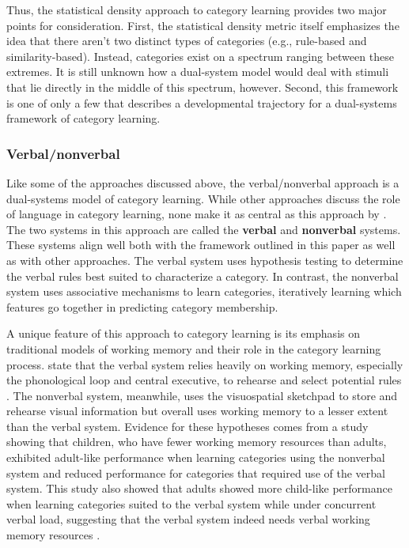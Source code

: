 \documentclass[../dissertation.tex]{subfiles}
\begin{document}
	Thus, the statistical density approach to category learning provides two major points for consideration. First, the statistical density metric itself emphasizes the idea that there aren't two distinct types of categories (e.g., rule-based and similarity-based). Instead, categories exist on a spectrum ranging between these extremes. It is still unknown how a dual-system model would deal with stimuli that lie directly in the middle of this spectrum, however. Second, this framework is one of only a few that describes a developmental trajectory for a dual-systems framework of category learning.
	
\subsubsection{Verbal/nonverbal}
	Like some of the approaches discussed above, the verbal/nonverbal approach is a dual-systems model of category learning. While other approaches discuss the role of language in category learning, none make it as central as this approach by \citet{Minda2010}. The two systems in this approach are called the \textbf{verbal} and \textbf{nonverbal} systems. These systems align well both with the framework outlined in this paper as well as with other approaches. The verbal system uses hypothesis testing to determine the verbal rules best suited to characterize a category. In contrast, the nonverbal system uses associative mechanisms to learn categories, iteratively learning which features go together in predicting category membership. \par
	A unique feature of this approach to category learning is its emphasis on traditional models of working memory and their role in the category learning process. \citet{Minda2010} state that the verbal system relies heavily on working memory, especially the phonological loop and central executive, to rehearse and select potential rules \citep{Baddeley1974}. The nonverbal system, meanwhile, uses the visuospatial sketchpad to store and rehearse visual information but overall uses working memory to a lesser extent than the verbal system. Evidence for these hypotheses comes from a study showing that children, who have fewer working memory resources than adults, exhibited adult-like performance when learning categories using the nonverbal system and reduced performance for categories that required use of the verbal system. This study also showed that adults showed more child-like performance when learning categories suited to the verbal system while under concurrent verbal load, suggesting that the verbal system indeed needs verbal working memory resources \citep{Minda2008}. \par
\end{document}

